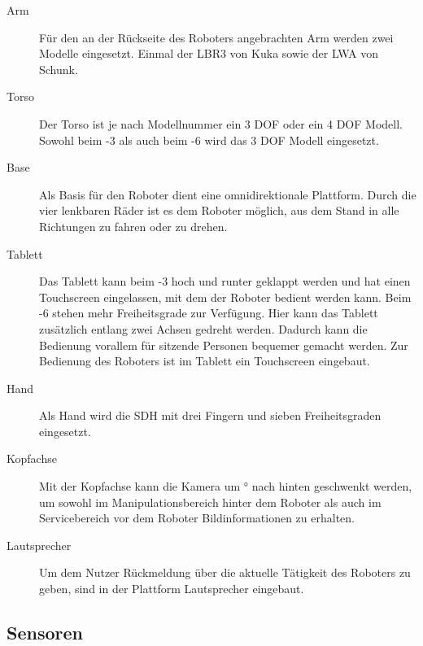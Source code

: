 \begin{description}
  \item[Arm] Für den an der Rückseite des Roboters
    angebrachten Arm werden zwei Modelle eingesetzt. Einmal der \ac{LBR3} von
    Kuka sowie der \ac{LWA} von Schunk. 
  \item[Torso] Der Torso ist je nach
    Modellnummer ein 3 \ac{DOF} oder ein 4 \ac{DOF} Modell. Sowohl beim -3 als auch beim -6 wird das 3 \ac{DOF} Modell eingesetzt.
  \item[Base] Als Basis für den Roboter dient eine omnidirektionale Plattform.
    Durch die vier lenkbaren Räder ist es dem Roboter möglich,
    aus dem Stand in alle Richtungen zu fahren oder zu drehen.
  \item[Tablett] Das Tablett kann beim -3 hoch und runter geklappt werden
    und hat einen Touchscreen eingelassen, mit dem der Roboter bedient werden
    kann. Beim -6 stehen mehr Freiheitsgrade zur Verfügung. Hier kann das
    Tablett zusätzlich entlang zwei Achsen gedreht werden. Dadurch kann die
    Bedienung vorallem für sitzende Personen bequemer gemacht werden. 
  Zur Bedienung des
    Roboters ist im Tablett ein Touchscreen eingebaut. 
  \item[Hand]
    Als Hand wird die \ac{SDH} mit drei Fingern und sieben Freiheitsgraden
    eingesetzt. 
  \item[Kopfachse] Mit der Kopfachse kann die Kamera um \unit[180]{°} nach
    hinten geschwenkt werden, um sowohl im Manipulationsbereich hinter dem 
    Roboter als auch im Servicebereich vor dem Roboter Bildinformationen zu
    erhalten. 
  \item[Lautsprecher] Um dem
    Nutzer Rückmeldung über die aktuelle Tätigkeit des Roboters zu geben, sind in
    der Plattform Lautsprecher eingebaut.

\end{description}

\subsection{Sensoren}

